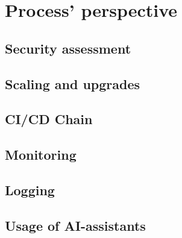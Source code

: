 \section{Process' perspective}
\subsection{Security assessment}


\subsection{Scaling and upgrades}


\subsection{CI/CD Chain}\label{cicd}


\subsection{Monitoring}


\subsection{Logging}


\subsection{Usage of AI-assistants}
